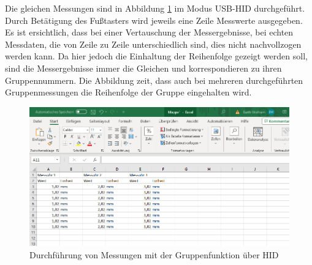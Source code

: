Die gleichen Messungen sind in Abbildung \ref{fig:MessungenGruppenfunktionHID} im Modus \ac{USB}-\ac{HID} durchgeführt. Durch Betätigung des Fußtasters wird jeweils eine Zeile Messwerte ausgegeben. Es ist ersichtlich, dass bei einer Vertauschung der Messergebnisse, bei echten Messdaten, die von Zeile zu Zeile unterschiedlich sind, dies nicht nachvollzogen werden kann. Da hier jedoch die Einhaltung der Reihenfolge gezeigt werden soll, sind die Messergebnisse immer die Gleichen und korrespondieren zu ihren Gruppennummern. Die Abbildung zeit, dass auch bei mehreren durchgeführten Gruppenmessungen die Reihenfolge der Gruppe eingehalten wird.
\begin{figure}[H] 
	\centering
	\includegraphics[width=\textwidth]{figures/USBHIDGroup.png}
	\caption{Durchführung von Messungen mit der Gruppenfunktion über HID}
	\label{fig:MessungenGruppenfunktionHID}
\end{figure}

